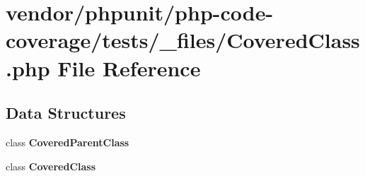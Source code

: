 \section{vendor/phpunit/php-\/code-\/coverage/tests/\+\_\+files/\+Covered\+Class.php File Reference}
\label{php-code-coverage_2tests_2__files_2_covered_class_8php}
\subsection*{Data Structures}
\begin{DoxyCompactItemize}
\item 
class {\bf Covered\+Parent\+Class}
\item 
class {\bf Covered\+Class}
\end{DoxyCompactItemize}
